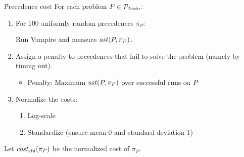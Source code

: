 \documentclass{beamer}
\begin{document}
\begin{frame}{Precedence cost}
For each problem $P \in \mathcal{P}_{\mathit{train}}$:
\begin{enumerate}
	\item For 100 uniformly random precedences $\pi_P$:

	Run Vampire and measure $\operatorname{\mathit{ast}}(P,\pi_P)$.
	\item Assign a penalty to precedences that fail to solve the problem (namely by timing out).
	\begin{itemize}
		\item Penalty: Maximum $\operatorname{\mathit{ast}}(P,\pi_P)$ over successful runs on $P$
	\end{itemize}
	\item Normalize the costs:
	\begin{enumerate}
		\item Log-scale
		\item Standardize (ensure mean 0 and standard deviation 1)
	\end{enumerate}
\end{enumerate}
Let $\operatorname{\mathit{cost_{std}}}(\pi_P)$ be the normalized cost of $\pi_P$.
\end{frame}
\end{document}
